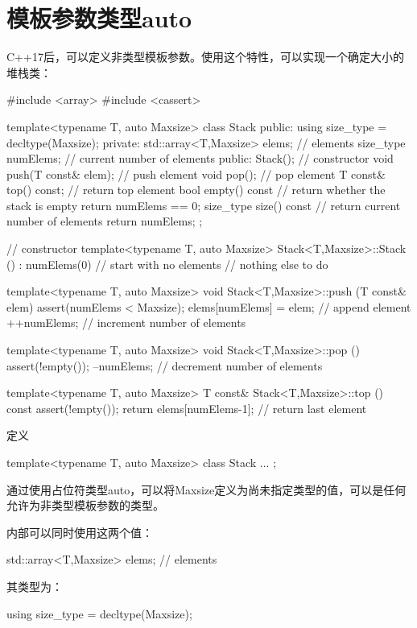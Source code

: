 \section{模板参数类型auto}
C++17后，可以定义非类型模板参数。使用这个特性，可以实现一个确定大小的堆栈类：

\begin{cpp}
#include <array>
#include <cassert>

template<typename T, auto Maxsize>
class Stack {
	public:
	using size_type = decltype(Maxsize);
private:
	std::array<T,Maxsize> elems; // elements
	size_type numElems; // current number of elements
public:
	Stack(); // constructor
	void push(T const& elem); // push element
	void pop(); // pop element
	T const& top() const; // return top element
	bool empty() const { // return whether the stack is empty
		return numElems == 0;
	}
	size_type size() const { // return current number of elements
		return numElems;
	}
};

// constructor
template<typename T, auto Maxsize>
Stack<T,Maxsize>::Stack ()
: numElems(0) { // start with no elements
	// nothing else to do
}

template<typename T, auto Maxsize>
void Stack<T,Maxsize>::push (T const& elem) {
	assert(numElems < Maxsize);
	elems[numElems] = elem; // append element
	++numElems; // increment number of elements
}

template<typename T, auto Maxsize>
void Stack<T,Maxsize>::pop () {
	assert(!empty());
	--numElems; // decrement number of elements
}

template<typename T, auto Maxsize>
T const& Stack<T,Maxsize>::top () const {
	assert(!empty());
	return elems[numElems-1]; // return last element
}
\end{cpp}

定义

\begin{cpp}
template<typename T, auto Maxsize>
class Stack {
	...
};
\end{cpp}

通过使用占位符类型auto，可以将Maxsize定义为尚未指定类型的值，可以是任何允许为非类型模板参数的类型。

内部可以同时使用这两个值：

\begin{cpp}
std::array<T,Maxsize> elems; // elements
\end{cpp}

其类型为：

\begin{cpp}
using size_type = decltype(Maxsize);
\end{cpp}

